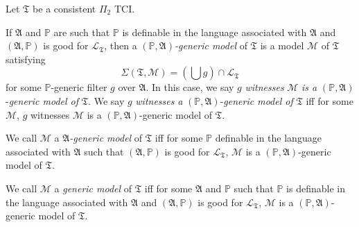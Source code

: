 \documentclass[12pt]{article}
\numberwithin{equation}{section}
\begin{document}
\begin{defi}
Let $\mathfrak{T}$ be a consistent $\Pi_2$ TCI. 

If $\mathfrak{A}$ and $\mathbb{P}$ are such that $\mathbb{P}$ is definable in the language associated with $\mathfrak{A}$ and $(\mathfrak{A}, \mathbb{P})$ is good for $\mathcal{L}_{\mathfrak{T}}$, then a $(\mathbb{P}, \mathfrak{A})$\emph{-generic model} of $\mathfrak{T}$ is a model $\mathcal{M}$ of $\mathfrak{T}$ satisfying $$\Sigma(\mathfrak{T}, \mathcal{M}) = (\bigcup g) \cap \mathcal{L}_{\mathfrak{T}}$$ for some $\mathbb{P}$-generic filter $g$ over $\mathfrak{A}$. In this case, we say $g$ \emph{witnesses} $\mathcal{M}$ \emph{is a} $(\mathbb{P}, \mathfrak{A})$-\emph{generic model of} $\mathfrak{T}$. We say $g$ \emph{witnesses} \emph{a} $(\mathbb{P}, \mathfrak{A})$-\emph{generic model of} $\mathfrak{T}$ iff for some $\mathcal{M}$, $g$ witnesses $\mathcal{M}$ is a $(\mathbb{P}, \mathfrak{A})$-generic model of $\mathfrak{T}$.

We call $\mathcal{M}$ a $\mathfrak{A}$\emph{-generic model} of $\mathfrak{T}$ iff for some $\mathbb{P}$ definable in the language associated with $\mathfrak{A}$ such that $(\mathfrak{A}, \mathbb{P})$ is good for $\mathcal{L}_{\mathfrak{T}}$, $\mathcal{M}$ is a $(\mathbb{P}, \mathfrak{A})$-generic model of $\mathfrak{T}$.

We call $\mathcal{M}$ a \emph{generic model} of $\mathfrak{T}$ iff for some $\mathfrak{A}$ and $\mathbb{P}$ such that $\mathbb{P}$ is definable in the language associated with $\mathfrak{A}$ and $(\mathfrak{A}, \mathbb{P})$ is good for $\mathcal{L}_{\mathfrak{T}}$, $\mathcal{M}$ is a $(\mathbb{P}, \mathfrak{A})$-generic model of $\mathfrak{T}$.   
\end{defi}
\end{document}
